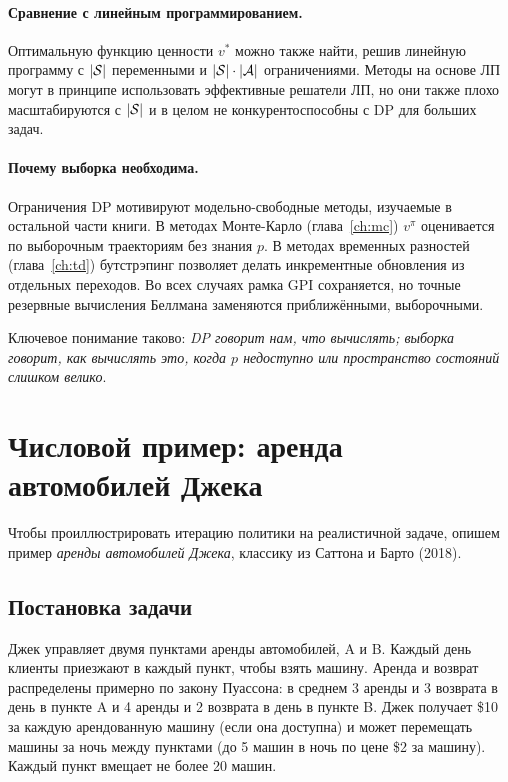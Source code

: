 \paragraph{Сравнение с линейным программированием.}
Оптимальную функцию ценности $v^*$ можно также найти, решив линейную программу с $|\mathcal{S}|$ переменными и $|\mathcal{S}| \cdot |\mathcal{A}|$ ограничениями.  Методы на основе ЛП могут в принципе использовать эффективные решатели ЛП, но они также плохо масштабируются с $|\mathcal{S}|$ и в целом не конкурентоспособны с DP для больших задач.

\paragraph{Почему выборка необходима.}
Ограничения DP мотивируют модельно-свободные методы, изучаемые в остальной части книги.  В методах Монте-Карло (глава~\ref{ch:mc}) $v^\pi$ оценивается по выборочным траекториям без знания $p$.  В методах временных разностей (глава~\ref{ch:td}) бутстрэпинг позволяет делать инкрементные обновления из отдельных переходов.  Во всех случаях рамка GPI сохраняется, но точные резервные вычисления Беллмана заменяются приближёнными, выборочными.

Ключевое понимание таково: \emph{DP говорит нам, что вычислять; выборка говорит, как вычислять это, когда $p$ недоступно или пространство состояний слишком велико}.

\section{Числовой пример: аренда автомобилей Джека}
\label{sec:car-rental}

Чтобы проиллюстрировать итерацию политики на реалистичной задаче, опишем пример \emph{аренды автомобилей Джека}, классику из Саттона и Барто (2018).

\subsection*{Постановка задачи}

Джек управляет двумя пунктами аренды автомобилей, A и B.  Каждый день клиенты приезжают в каждый пункт, чтобы взять машину.  Аренда и возврат распределены примерно по закону Пуассона: в среднем 3 аренды и 3 возврата в день в пункте A и 4 аренды и 2 возврата в день в пункте B.  Джек получает \$10 за каждую арендованную машину (если она доступна) и может перемещать машины за ночь между пунктами (до 5 машин в ночь по цене \$2 за машину).  Каждый пункт вмещает не более 20 машин.

